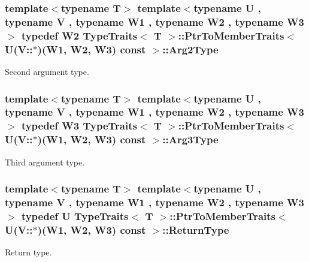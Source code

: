 \subsubsection[{\texorpdfstring{Arg2\+Type}{Arg2Type}}]{\setlength{\rightskip}{0pt plus 5cm}template$<$typename T$>$ template$<$typename U , typename V , typename W1 , typename W2 , typename W3 $>$ typedef W2 {\bf Type\+Traits}$<$ T $>$\+::{\bf Ptr\+To\+Member\+Traits}$<$ U(V\+::$\ast$)(W1, W2, W3) const  $>$\+::{\bf Arg2\+Type}}\hypertarget{structTypeTraits_1_1PtrToMemberTraits_3_01U_07V_1_1_5_08_07W1_00_01W2_00_01W3_08_01const_01_01_4_a3e2f96cf6ac6cf96b374d0ee8fdd3e67}{}\label{structTypeTraits_1_1PtrToMemberTraits_3_01U_07V_1_1_5_08_07W1_00_01W2_00_01W3_08_01const_01_01_4_a3e2f96cf6ac6cf96b374d0ee8fdd3e67}
Second argument type. 
\subsubsection[{\texorpdfstring{Arg3\+Type}{Arg3Type}}]{\setlength{\rightskip}{0pt plus 5cm}template$<$typename T$>$ template$<$typename U , typename V , typename W1 , typename W2 , typename W3 $>$ typedef W3 {\bf Type\+Traits}$<$ T $>$\+::{\bf Ptr\+To\+Member\+Traits}$<$ U(V\+::$\ast$)(W1, W2, W3) const  $>$\+::{\bf Arg3\+Type}}\hypertarget{structTypeTraits_1_1PtrToMemberTraits_3_01U_07V_1_1_5_08_07W1_00_01W2_00_01W3_08_01const_01_01_4_a0617216c754a6233c227d02ded60e0bf}{}\label{structTypeTraits_1_1PtrToMemberTraits_3_01U_07V_1_1_5_08_07W1_00_01W2_00_01W3_08_01const_01_01_4_a0617216c754a6233c227d02ded60e0bf}
Third argument type. 
\subsubsection[{\texorpdfstring{Return\+Type}{ReturnType}}]{\setlength{\rightskip}{0pt plus 5cm}template$<$typename T$>$ template$<$typename U , typename V , typename W1 , typename W2 , typename W3 $>$ typedef U {\bf Type\+Traits}$<$ T $>$\+::{\bf Ptr\+To\+Member\+Traits}$<$ U(V\+::$\ast$)(W1, W2, W3) const  $>$\+::{\bf Return\+Type}}\hypertarget{structTypeTraits_1_1PtrToMemberTraits_3_01U_07V_1_1_5_08_07W1_00_01W2_00_01W3_08_01const_01_01_4_af5e6f2b3ff5bfb9bc84d7e50f3c6217b}{}\label{structTypeTraits_1_1PtrToMemberTraits_3_01U_07V_1_1_5_08_07W1_00_01W2_00_01W3_08_01const_01_01_4_af5e6f2b3ff5bfb9bc84d7e50f3c6217b}
Return type. 

